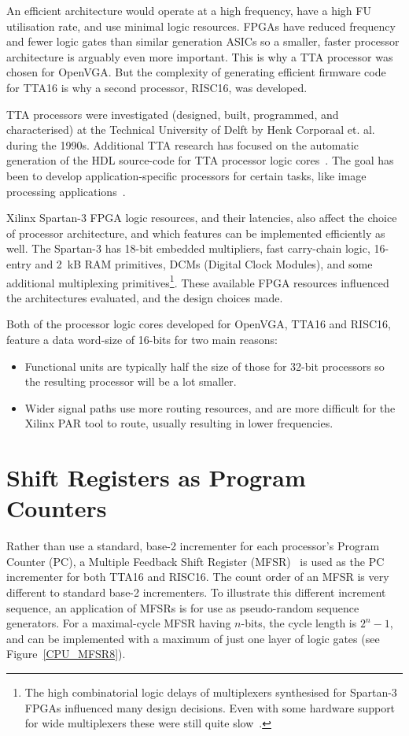 An efficient architecture would operate at a high frequency, have a high FU
utilisation rate, and use minimal logic resources. FPGAs have reduced frequency
and fewer logic gates than similar generation ASICs so a smaller, faster
processor architecture is arguably even more important. This is why a TTA
processor was chosen for OpenVGA. But the complexity of generating efficient
firmware code for TTA16 is why a second processor, RISC16, was developed.

TTA processors were investigated (designed, built, programmed, and characterised)
at the Technical University of Delft by Henk Corporaal et.
al.~\cite{corporaal1999tmi, corporaal:tta, corporaal1993maa} during the 1990s.
Additional TTA research has focused on the automatic generation of the HDL
source-code for TTA processor logic cores~\cite{hoogerbrugge1995ast,
jaaskelainen2007cta}. The goal has been to develop application-specific
processors for certain tasks, like image processing
applications~\cite{corporaal1999tmi}.

Xilinx Spartan-3 FPGA logic resources, and their latencies, also affect the
choice of processor architecture, and which features can be implemented
efficiently as well. The Spartan-3 has 18-bit embedded multipliers, fast
carry-chain logic, 16-entry and 2~kB RAM primitives, DCMs (Digital Clock
Modules), and some additional multiplexing primitives\footnote{The high
combinatorial logic delays of multiplexers synthesised for Spartan-3 FPGAs
influenced many design decisions. Even with some hardware support for wide
multiplexers these were still quite slow~\cite{Xilinx_SP3_DS}.}. These available
FPGA resources influenced the architectures evaluated, and the design choices
made.

Both of the processor logic cores developed for OpenVGA, TTA16 and RISC16,
feature a data word-size of 16-bits for two main reasons:
\begin{itemize}
  \item Functional units are typically half the size of those for 32-bit
  processors so the resulting processor will be a lot smaller.
  \item Wider signal paths use more routing resources, and are more difficult
  for the Xilinx PAR tool to route, usually resulting in lower frequencies.
\end{itemize}


\section{Shift Registers as Program Counters}
Rather than use a standard, base-2 incrementer for each processor's Program
Counter (PC), a Multiple
Feedback Shift Register (MFSR)~\cite{MFSR_List} is used as the PC incrementer for both
TTA16 and RISC16. The count order of an MFSR is very different to standard base-2
incrementers. To illustrate this different increment sequence, an application of
MFSRs is for use as pseudo-random sequence generators. For a maximal-cycle MFSR
having $n$-bits, the cycle length is $2^n-1$, and can be implemented with a
maximum of just one layer of logic gates (see Figure~\ref{CPU_MFSR8}).

